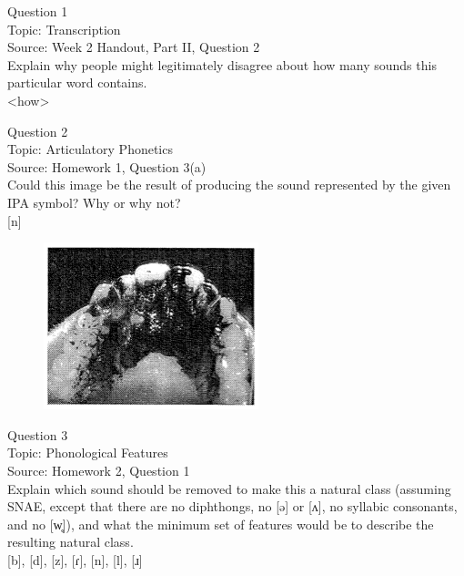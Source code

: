 \documentclass[12pt]{article}
\begin{document}
{\large Question 1}\\

Topic: Transcription\\
Source: Week 2 Handout, Part II, Question 2\\

Explain why people might legitimately disagree about how many sounds this particular word contains.\\

<how>


\newpage

{\large Question 2}\\

Topic: Articulatory Phonetics\\
Source: Homework 1, Question 3(a)\\

Could this image be the result of producing the sound represented by the given IPA symbol? Why or why not?\\

{[n]}

\begin{figure}[H]
\includegraphics{../images/staticpalatography_stop.png}
\end{figure}

\newpage

{\large Question 3}\\

Topic: Phonological Features\\
Source: Homework 2, Question 1\\

Explain which sound should be removed to make this a natural class (assuming SNAE, except that there are no diphthongs, no [ə] or [ʌ], no syllabic consonants, and no [w̥]), and what the minimum set of features would be to describe the resulting natural class.\\

{[b]}, {[d]}, {[z]}, {[ɾ]}, {[n]}, {[l]}, {[ɹ]}


\newpage
\end{document}

